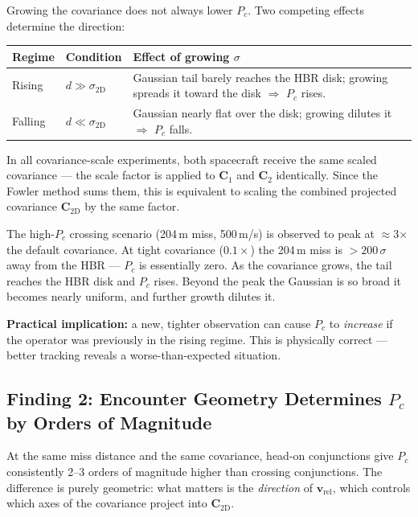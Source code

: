 \documentclass[11pt]{article}
\begin{document}
Growing the covariance does not always lower $P_c$.  Two competing effects
determine the direction:

\begin{center}
\begin{tabular}{p{3.5cm}p{4cm}p{6cm}}
  \toprule
  Regime & Condition & Effect of growing $\sigma$ \\
  \midrule
  Rising & $d \gg \sigma_\text{2D}$ &
    Gaussian tail barely reaches the HBR disk; growing spreads it toward the
    disk $\Rightarrow$ $P_c$ rises. \\[4pt]
  Falling & $d \ll \sigma_\text{2D}$ &
    Gaussian nearly flat over the disk; growing dilutes it
    $\Rightarrow$ $P_c$ falls. \\
  \bottomrule
\end{tabular}
\end{center}

In all covariance-scale experiments, both spacecraft receive the same scaled
covariance — the scale factor is applied to $\mathbf{C}_1$ and $\mathbf{C}_2$
identically.  Since the Fowler method sums them, this is equivalent to scaling
the combined projected covariance $\mathbf{C}_\text{2D}$ by the same factor.

The high-$P_c$ crossing scenario (204\,m miss, 500\,m/s) is observed to peak
at $\approx$3$\times$ the default covariance.  At tight covariance
($0.1\times$) the 204\,m miss is $>200\,\sigma$ away from the HBR — $P_c$ is
essentially zero.  As the covariance grows, the tail reaches the HBR disk and
$P_c$ rises.  Beyond the peak the Gaussian is so broad it becomes nearly
uniform, and further growth dilutes it.

\textbf{Practical implication:} a new, tighter observation can cause $P_c$ to
\emph{increase} if the operator was previously in the rising regime.  This is
physically correct — better tracking reveals a worse-than-expected situation.

\subsection{Finding 2: Encounter Geometry Determines $P_c$ by Orders of Magnitude}
\label{sec:finding2}

At the same miss distance and the same covariance, head-on conjunctions give
$P_c$ consistently 2--3 orders of magnitude higher than crossing conjunctions.
The difference is purely geometric: what matters is the \emph{direction} of
$\mathbf{v}_\text{rel}$, which controls which axes of the covariance project
into $\mathbf{C}_\text{2D}$.
\end{document}
